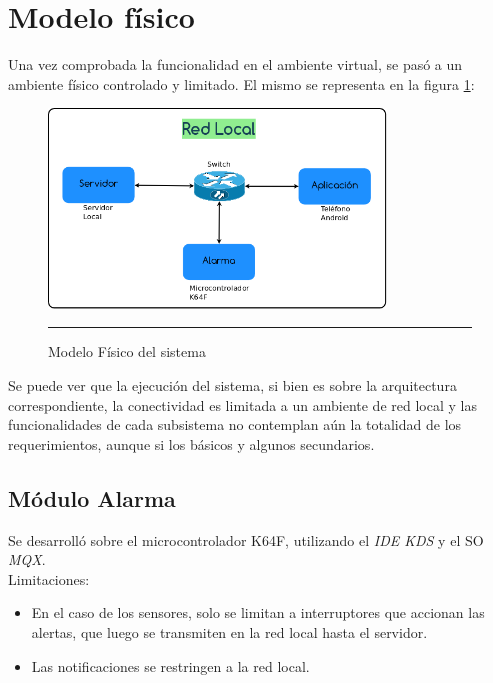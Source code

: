 \newpage


\section{Modelo físico}

Una vez comprobada la funcionalidad en el ambiente virtual, se pasó a un ambiente físico controlado y limitado.
El mismo se representa en la figura \ref{Diagrama_fisico}:

\begin{figure}[htbp]
	\centering
		\includegraphics[width=0.8\textwidth]{Figures/Diagrama_fisico.png}
		\rule{35em}{1.5pt}
	\caption[Modelo Físico del sistema]{Modelo Físico del sistema}
\label{Diagrama_fisico}
\end{figure}

Se puede ver que la ejecución del sistema, si bien es sobre la arquitectura correspondiente, la conectividad es limitada a un ambiente de red local y las funcionalidades de cada subsistema no contemplan aún la totalidad de los requerimientos, aunque si los básicos y algunos secundarios.
\newpage


	\subsection{Módulo Alarma}

Se desarrolló sobre el microcontrolador K64F, utilizando el \textit{IDE KDS} y el SO \textit{MQX}. \\
Limitaciones:
\begin{itemize}
\item En el caso de los sensores, solo se limitan a interruptores que accionan las alertas, que luego se transmiten en la red local hasta el servidor. 
\item Las notificaciones se restringen a la red local.
\end{itemize}


